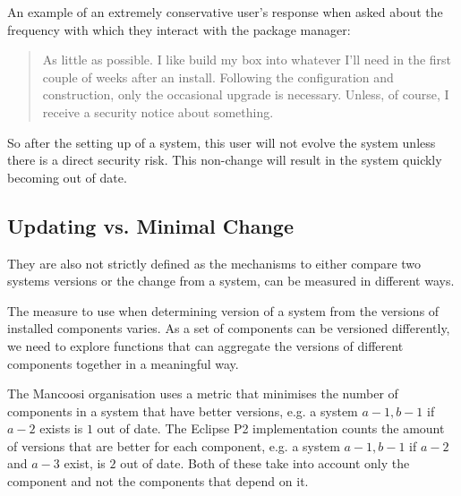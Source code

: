 An example of an extremely conservative user's response when asked about the frequency with which they interact with the package manager:
\begin{quotation}
As little as possible. I like build my box into whatever I'll need in the first couple of weeks after an install. 
Following the configuration and construction, only the occasional upgrade is necessary. 
Unless, of course, I receive a security notice about something.
\end{quotation}
So after the setting up of a system, this user will not evolve the system unless there is a direct security risk.
This non-change will result in the system quickly becoming out of date.

\subsection{Updating vs. Minimal Change}





They are also not strictly defined as the mechanisms to either compare two systems versions or the change from a system,
can be measured in different ways.

The measure to use when determining version of a system from the versions of installed components varies.
As a set of components can be versioned differently, 
we need to explore functions that can aggregate the versions of different components together in a meaningful way.

The Mancoosi organisation uses a metric that minimises the number of components in a system that have better versions, 
e.g. a system $a-1,b-1$ if $a-2$ exists is $1$ out of date. 
The Eclipse P2 implementation counts the amount of versions that are better for each component,
e.g. a system $a-1,b-1$ if $a-2$ and $a-3$ exist, is $2$ out of date.
Both of these take into account only the component and not the components that depend on it.

